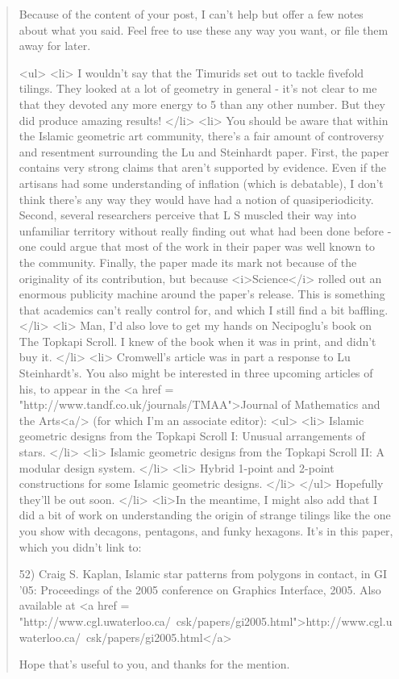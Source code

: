 \begin{quote}

 Because of the content of your post, I can't help but offer a few
notes about what you said.  Feel free to use these any way you want,
or file them away for later.

<ul>
<li>
I wouldn't say that the Timurids set out to tackle fivefold tilings.
  They looked at a lot of geometry in general - it's not clear to
  me that they devoted any more energy to 5 than any other number.
  But they did produce amazing results!
</li>
<li>
You should be aware that within the Islamic geometric art
  community, there's a fair amount of controversy and resentment
  surrounding the Lu and Steinhardt paper.  First, the paper
  contains very strong claims that aren't supported by evidence.
  Even if the artisans had some understanding of inflation (which
  is debatable), I don't think there's any way they would have had
  a notion of quasiperiodicity.  Second, several researchers
  perceive that L\text{\&} S muscled their way into unfamiliar territory
  without really finding out what had been done before - one could
  argue that most of the work in their paper was well known to the
  community.  Finally, the paper made its mark not because of the
  originality of its contribution, but because <i>Science</i> rolled out
  an enormous publicity machine around the paper's release.  This
  is something that academics can't really control for, and which
  I still find a bit baffling.
</li>
<li>
Man, I'd also love to get my hands on Necipoglu's book on The
  Topkapi Scroll.  I knew of the book when it was in print, and
  didn't buy it.  
</li>
<li>
Cromwell's article was in part a response to Lu \text{\&}  Steinhardt's.
  You also might be interested in three upcoming articles of his,
  to appear in the <a href = "http://www.tandf.co.uk/journals/TMAA">Journal 
  of Mathematics and the Arts<a/> (for which I'm an associate editor):
<ul>
<li>
    Islamic geometric designs from the Topkapi Scroll I:
    Unusual arrangements of stars.
</li>
<li>
    Islamic geometric designs from the Topkapi Scroll II:
    A modular design system.
</li>
<li>
    Hybrid 1-point and 2-point constructions for some Islamic
    geometric designs.
</li>
</ul>
  Hopefully they'll be out soon.
</li>
<li>In the meantime, I might also add that I did a bit of work on
  understanding the origin of strange tilings like the one you
  show with decagons, pentagons, and funky hexagons.  It's in
  this paper, which you didn't link to:

52) Craig S. Kaplan, Islamic star patterns from polygons in contact,
in GI '05: Proceedings of the 2005 conference on Graphics Interface, 2005. 
Also available at
<a href = "http://www.cgl.uwaterloo.ca/~csk/papers/gi2005.html">http://www.cgl.uwaterloo.ca/~csk/papers/gi2005.html</a>

Hope that's useful to you, and thanks for the mention.

\end{quote}

